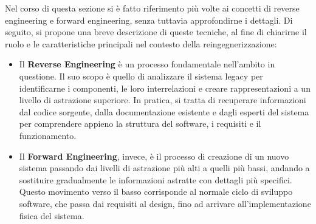 Nel corso di questa sezione si è fatto riferimento più volte ai concetti di reverse engineering e forward engineering, senza tuttavia approfondirne i dettagli. Di seguito, si propone una breve descrizione di queste tecniche, al fine di chiarirne il ruolo e le caratteristiche principali nel contesto della reingegnerizzazione:

\begin{itemize}
  \item Il \textbf{Reverse Engineering} è un processo fondamentale nell'ambito in questione. Il suo scopo è quello di analizzare il sistema legacy per identificarne i componenti, le loro interrelazioni e creare rappresentazioni a un livello di astrazione superiore. In pratica, si tratta di recuperare informazioni dal codice sorgente, dalla documentazione esistente e dagli esperti del sistema per comprendere appieno la struttura del software, i requisiti e il funzionamento.
  \item Il \textbf{Forward Engineering}, invece, è il processo di creazione di un nuovo sistema passando dai livelli di astrazione più alti a quelli più bassi, andando a sostituire gradualmente le informazioni astratte con dettagli più specifici. Questo movimento verso il basso corrisponde al normale ciclo di sviluppo software, che passa dai requisiti al design, fino ad arrivare all'implementazione fisica del sistema.
\end{itemize}


